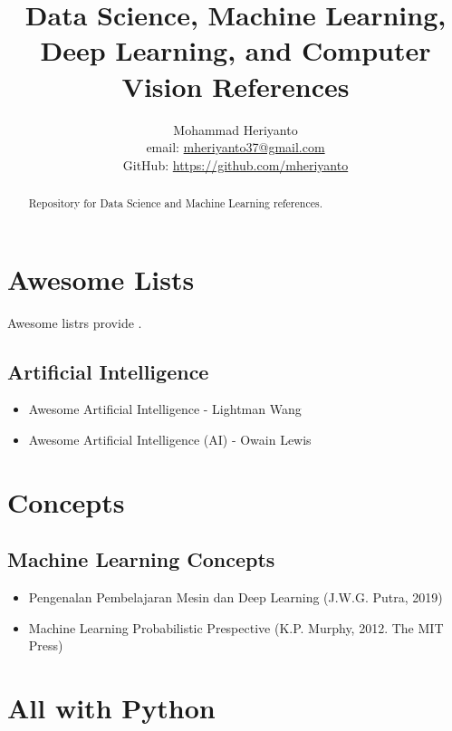 \documentclass[12pt,oneside,a4paper]{article}
\begin{document}
\title{Data Science, Machine Learning, Deep Learning, and Computer Vision References}
\author{Mohammad Heriyanto \\ email: \href{mailto:mheriyanto37@gmail.com}{mheriyanto37@gmail.com} \\ GitHub: \href{https://github.com/mheriyanto/Data-Science-and-Machine-Learning-References}{https://github.com/mheriyanto}}
   
\maketitle

\begin{abstract}
Repository for Data Science and Machine Learning references.
\end{abstract}

\section{Awesome Lists}
Awesome listrs provide .

\subsection{Artificial Intelligence}
\begin{itemize}
\item Awesome Artificial Intelligence - Lightman Wang
\item Awesome Artificial Intelligence (AI) - Owain Lewis
\end{itemize}

\section{Concepts}
\subsection{Machine Learning Concepts}
\begin{itemize}
\item Pengenalan Pembelajaran Mesin dan Deep Learning (J.W.G. Putra, 2019)
\item Machine Learning Probabilistic Prespective (K.P. Murphy, 2012. The MIT Press)
\end{itemize}

\section{All with Python}
\end{document}

